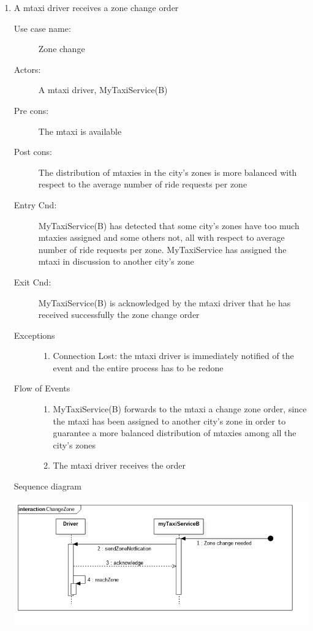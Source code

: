 \documentclass[11pt,titlepage]{article} %
\begin{document}
\begin{enumerate}
	
	      \item A mtaxi driver receives a zone change order
		\begin{description}
		        \item [Use case name:] Zone change
		        \item [Actors:] A mtaxi driver, MyTaxiService(B)
		        \item [Pre cons:] The mtaxi is available
		        \item [Post cons:] The distribution of mtaxies in the city's zones is more balanced
		        with respect to the average number of ride requests per zone
		        \item [Entry Cnd:] MyTaxiService(B) has detected that some city's zones have too much mtaxies assigned
		        and some others not, all with respect to average number of ride requests per zone. MyTaxiService
		        has assigned the mtaxi in discussion to another city's zone
		        \item [Exit Cnd:] MyTaxiService(B) is acknowledged by the mtaxi driver that he has received successfully
		        the zone change order
		        \item [Exceptions]\hfill
			\begin{enumerate}
			          \item Connection Lost: the mtaxi driver is immediately notified of the event and the entire process has to be redone
			\end{enumerate}
		        \item [Flow of Events]\hfill
			\begin{enumerate}
			          \item MyTaxiService(B) forwards to the mtaxi a change zone order, since the mtaxi has been assigned to another city's zone in order to guarantee
			          a more balanced distribution of mtaxies among all the city's zones
			          \item The mtaxi driver receives the order
			\end{enumerate}
		\end{description}
		Sequence diagram
		\begin{center}
		\includegraphics[scale=0.52]{usecase10.png}
		\end{center}
	

\end{enumerate}
\end{document}
